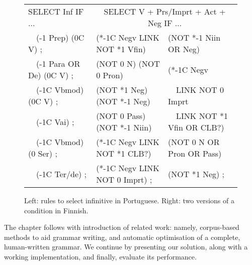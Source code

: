 \begin{figure}[t]
\ttfamily
\centering
\begin{tabular}{l | l l}
SELECT Inf IF ... & \multicolumn{2}{c}{SELECT V + Prs/Imprt + Act + Neg IF ...} \\
~~(-1 Prep) (0C V) ;       & (*-1C Negv LINK NOT *1 Vfin)  & (NOT *-1 Niin OR Neg)  \\
~~(-1 Para OR De) (0C V) ; & (NOT 0 N) (NOT 0 Pron)        & (*-1C Negv \\
~~(-1C Vbmod) (0C V) ;     & (NOT *1 Neg) (NOT *-1 Neg)    &  ~~LINK NOT 0 Imprt \\
~~(-1C Vai) ;              & (NOT 0 Pass) (NOT *-1 Niin)   &  ~~LINK NOT *1 Vfin OR CLB?) \\
~~(-1C Vbmod) (0 Ser) ;    & (*-1C Negv LINK NOT *1 CLB?)  & (NOT 0 N OR Pron OR Pass) \\
~~(-1C Ter/de) ;           & (*-1C Negv LINK NOT 0 Imprt) ;  & (NOT *1 Neg) ; \\

\end{tabular}

\caption{Left: rules to select infinitive in Portuguese. 
        Right: two versions of a condition in Finnish.}

\label{fig:infrules}
\end{figure}

The chapter follows with introduction of related work: namely, corpus-based methods to aid grammar writing, and automatic optimisation of a complete, human-written grammar. We continue by presenting our solution, along with a working implementation, and finally, evaluate its performance.







